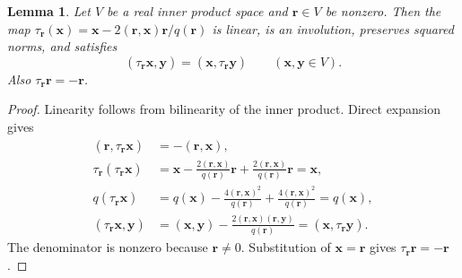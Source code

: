 \documentclass[11pt]{amsart}
\newcommand\Zy{{\mathbf y}}
\newcommand\Zx{{\mathbf x}}
\newtheorem{lemma}[theorem]{Lemma}
\theoremstyle{definition}
\newcommand{\Zr}{{\mathbf r}}
\begin{document}
\begin{lemma}\label{lem:reflection}
Let $V$ be a real inner product space and $\Zr\in V$ be nonzero. Then
the map $\tau_{\Zr}(\Zx)=\Zx-2(\Zr,\Zx)\Zr/q(\Zr)$ is linear,
is an involution, preserves squared norms, and satisfies
\begin{equation}\label{eq:self-adjoint}
 (\tau_{\Zr}\Zx,\Zy)=(\Zx,\tau_{\Zr}\Zy)
 \qquad(\Zx,\Zy\in V).
\end{equation}
Also $\tau_{\Zr}\Zr=-\Zr$.
\end{lemma}
\begin{proof}
Linearity follows from bilinearity of the inner product. Direct expansion
gives
\begin{align*}
 (\Zr,\tau_{\Zr}\Zx)&=-(\Zr,\Zx),\\
 \tau_{\Zr}(\tau_{\Zr}\Zx)
 &=\Zx-\frac{2(\Zr,\Zx)}{q(\Zr)}\Zr
       +\frac{2(\Zr,\Zx)}{q(\Zr)}\Zr=\Zx,\\
 q(\tau_{\Zr}\Zx)
 &=q(\Zx)-\frac{4(\Zr,\Zx)^2}{q(\Zr)}
              +\frac{4(\Zr,\Zx)^2}{q(\Zr)}=q(\Zx),\\
 (\tau_{\Zr}\Zx,\Zy)
 &=(\Zx,\Zy)-\frac{2(\Zr,\Zx)(\Zr,\Zy)}{q(\Zr)}
  =(\Zx,\tau_{\Zr}\Zy).
\end{align*}
The denominator is nonzero because $\Zr\ne0$.
Substitution of $\Zx=\Zr$ gives $\tau_{\Zr}\Zr=-\Zr$.
\end{proof}
\end{document}
